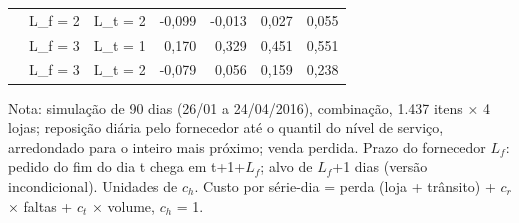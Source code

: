 \begin{table}[htbp]
\begin{tabular}{lllrrrr}
 & L\_f = 2 & L\_t = 2 & -0,099 & -0,013 & 0,027 & 0,055 \\
 & L\_f = 3 & L\_t = 1 & 0,170 & 0,329 & 0,451 & 0,551 \\
 & L\_f = 3 & L\_t = 2 & -0,079 & 0,056 & 0,159 & 0,238 \\
\bottomrule
\end{tabular}
\par\smallskip
{\footnotesize Nota: simulação de 90 dias (26/01 a 24/04/2016), combinação, 1.437 itens × 4 lojas; reposição diária pelo fornecedor até o quantil do nível de serviço, arredondado para o inteiro mais próximo; venda perdida. Prazo do fornecedor $L_f$: pedido do fim do dia t chega em t+1+$L_f$; alvo de $L_f$+1 dias (versão incondicional). Unidades de $c_h$. Custo por série-dia = perda (loja + trânsito) + $c_r$ × faltas + $c_t$ × volume, $c_h$ = 1.}
\end{table}
